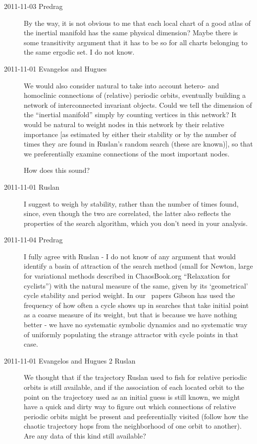 \begin{description}
\item[2011-11-03 Predrag] By the way, it is not obvious to me that each local
  chart of a good atlas of the inertial manifold has the same physical dimension?
  Maybe there is some transitivity argument that it has to be so for all
  charts belonging to the same ergodic set. I do not know.

\item[2011-11-01 Evangelos and Hugues]
  We would also consider natural to take into account hetero- and
  homoclinic connections of (relative) periodic orbits, eventually building
  a network of interconnected invariant objects. Could we tell the
  dimension of the ``inertial manifold'' simply by counting vertices in
  this network? It would be natural to weight nodes in this network by
  their relative importance [as estimated by either their stability or by
  the number of times they are found in Ruslan's random search (these are
  known)], so that we preferentially examine connections of the most
  important nodes.

  How does this sound?

\item[2011-11-01 Ruslan] I suggest to weigh by stability, rather than
  the number of times found, since, even though the two are correlated, the
  latter also reflects the properties of the search algorithm, which you
  don't need in your analysis.

\item[2011-11-04 Predrag] I fully agree with Ruslan - I do not know of
  any argument that would identify a basin of attraction of the search
  method (small for Newton, large for variational methods described in
  ChaosBook.org ``Relaxation for cyclists'') with the natural measure of
  the same, given by its `geometrical' cycle stability and period weight.
  In our \pCf\ papers Gibson has used the frequency of how often a cycle
  shows up in searches that take initial point as a coarse measure of its
  weight, but that is because we have nothing better - we have no
  systematic symbolic dynamics and no systematic way of uniformly
  populating the strange attractor with cycle points in that case.

\item[2011-11-01 Evangelos and Hugues 2 Ruslan] We thought that if the
  trajectory Ruslan used to fish for relative periodic orbits is still
  available, and if the association of each located orbit to the point on
  the trajectory used as an initial guess is still known, we might have a
  quick and dirty way to figure out which connections of relative periodic
  orbits might be present and preferentially visited (follow how the
  chaotic trajectory hops from the neighborhood of one orbit to another).
  Are any data of this kind still available?


\end{description}
